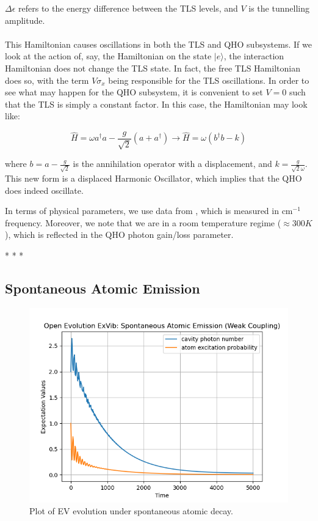 \documentclass[12pt]{article}
\begin{document}
$\Delta\epsilon$ refers to the energy difference between the TLS levels, and $V$ is the tunnelling amplitude. \\
\\
This Hamiltonian causes oscillations in both the TLS and QHO subsystems. If we look at the action of, say, the Hamiltonian on the state $|e\rangle$, the interaction Hamiltonian does not change the TLS state. In fact, the free TLS Hamiltonian does so, with the term $V\sigma_x$ being responsible for the TLS oscillations. 
In order to see what may happen for the QHO subsystem, it is convenient to set $V=0$ such that the TLS is simply a constant factor. In this case, the Hamiltonian may look like:

\begin{equation*}
    \hat{H} = \omega a^\dagger a - \frac{g}{\sqrt{2}}(a + a^\dagger) \rightarrow \hat{H} = \omega(b^\dagger b - k)
\end{equation*}

where $b = a - \frac{g}{\sqrt{2}} $ is the annihilation operator with a displacement, and $k = \frac{g}{\sqrt{2}\omega}$. This new form is a displaced Harmonic Oscillator, which implies that the QHO does indeed oscillate. 

In terms of physical parameters, we use data from \cite{ExVib2014-Hamiltonian}, which is measured in cm$^{-1}$ frequency. Moreover, we note that we are in a room temperature regime ($\approx300 K$), which is reflected in the QHO photon gain/loss parameter.  

\vspace{5cm}
\begin{center}
    {\Large{*        *        *}}
\end{center}
\newpage


\subsection{Spontaneous Atomic Emission}

\begin{figure}[h]
    \centering
    \includegraphics[width=\linewidth]{Research Project/Code/results/ExVib/OQS_TLS_Decay.png}
    \caption{Plot of EV evolution under spontaneous atomic decay.}
    \label{ExVib_OQS_TLS}
\end{figure}
\end{document}
